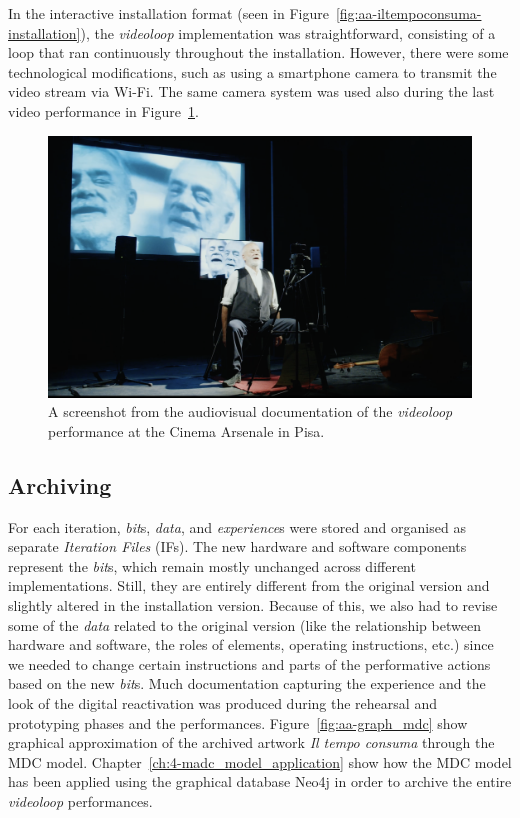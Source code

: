 In the interactive installation format (seen in Figure~\ref{fig:aa-iltempoconsuma-installation}), the \textit{videoloop} implementation was straightforward, consisting of a loop that ran continuously throughout the installation. However, there were some technological modifications, such as using a smartphone camera to transmit the video stream via Wi-Fi. The same camera system was used also during the last video performance in Figure~\ref{fig:aa-iltempoconsuma-pisa}.
\begin{figure}[!h]
    \centering
    \includegraphics[width=\linewidth]{chapters/appendix/a/image/figa-iltempoconsuma-pisa.png}
    \caption{A screenshot from the audiovisual documentation of the \textit{videoloop} performance at the Cinema Arsenale in Pisa.}
    \label{fig:aa-iltempoconsuma-pisa}
\end{figure}

\subsection*{Archiving}
For each iteration, \textit{bit}s, \textit{data}, and \textit{experience}s were stored and organised as separate \textit{Iteration Files} (IFs). The new hardware and software components represent the \textit{bit}s, which remain mostly unchanged across different implementations. Still, they are entirely different from the original version and slightly altered in the installation version. Because of this, we also had to revise some of the \textit{data} related to the original version (like the relationship between hardware and software, the roles of elements, operating instructions, etc.) since we needed to change certain instructions and parts of the performative actions based on the new \textit{bit}s. Much documentation capturing the experience and the look of the digital reactivation was produced during the rehearsal and prototyping phases and the performances. Figure~\ref{fig:aa-graph_mdc} show graphical approximation of the archived artwork \textit{Il tempo consuma} through the MDC model. Chapter~\ref{ch:4-madc_model_application} show how the MDC model has been applied using the graphical database Neo4j in order to archive the entire \textit{videoloop} performances.

